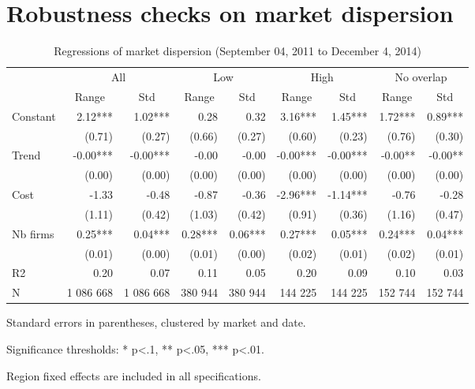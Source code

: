 \documentclass[english]{article}
\begin{document}
\newpage

\section{Robustness checks on market dispersion}

\begin{table}[htb!] %
\caption{Regressions of market dispersion (September 04, 2011 to December 4, 2014)}
\label{tab:regs_market_dispersion_all}
\begin{threeparttable}
\begin{tabular}{lrrrrrrrr}
    \toprule
    \toprule
          & \multicolumn{2}{c}{All} & \multicolumn{2}{c}{Low} & \multicolumn{2}{c}{High} & \multicolumn{2}{c}{No overlap} \\
          & \multicolumn{1}{c}{Range} & \multicolumn{1}{c}{Std} & \multicolumn{1}{c}{Range} & \multicolumn{1}{c}{Std} & \multicolumn{1}{c}{Range} & \multicolumn{1}{c}{Std} & \multicolumn{1}{c}{Range} & \multicolumn{1}{c}{Std} \\
    \midrule
    Constant & 2.12*** & 1.02*** & 0.28  & 0.32  & 3.16*** & 1.45*** & 1.72*** & 0.89*** \\
          & (0.71) & (0.27) & (0.66) & (0.27) & (0.60) & (0.23) & (0.76) & (0.30) \\
    Trend & -0.00*** & -0.00*** & -0.00 & -0.00 & -0.00*** & -0.00*** & -0.00** & -0.00** \\
          & (0.00) & (0.00) & (0.00) & (0.00) & (0.00) & (0.00) & (0.00) & (0.00) \\
    Cost  & -1.33 & -0.48 & -0.87 & -0.36 & -2.96*** & -1.14*** & -0.76 & -0.28 \\
          & (1.11) & (0.42) & (1.03) & (0.42) & (0.91) & (0.36) & (1.16) & (0.47) \\
    Nb firms & 0.25*** & 0.04*** & 0.28*** & 0.06*** & 0.27*** & 0.05*** & 0.24*** & 0.04*** \\
          & (0.01) & (0.00) & (0.01) & (0.00) & (0.02) & (0.01) & (0.02) & (0.01) \\
    \midrule
    R2    & 0.20  & 0.07  & 0.11  & 0.05  & 0.20  & 0.09  & 0.10  & 0.03 \\
    N     & 1 086  668 & 1 086  668 & 380  944 & 380  944 & 144  225 & 144  225 & 152  744 & 152  744 \\
    \bottomrule
    \bottomrule
\end{tabular}
\begin{tablenotes}
      \small
      \item Standard errors in parentheses, clustered by market and date.
      \item Significance thresholds: * p<.1, ** p<.05, *** p<.01.
      \item Region fixed effects are included in all specifications.
\end{tablenotes}
\end{threeparttable}
\end{table}
\end{document}
